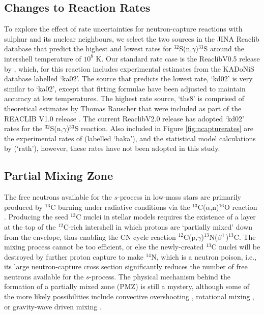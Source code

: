 \subsection{Changes to Reaction Rates}\label{sec:reactionratechanges}
To explore the effect of rate uncertainties for neutron-capture reactions with sulphur and its nuclear neighbours, we select the two sources in the JINA Reaclib database that predict the highest and lowest rates for $^{32}$S(n,$\gamma$)$^{33}$S around the intershell temperature of $10^8$ K. Our standard rate case is the ReaclibV0.5 release by \cite{Cyburt:2010ey}, which, for this reaction includes experimental estimates from the KADoNiS database \citep{Dillmann:2006fl} labelled `ka02'. The source that predicts the lowest rate, `kd02' is very similar to `ka02', except that fitting formulae have been adjusted to maintain accuracy at low temperatures. The highest rate source, `ths8' is comprised of theoretical estimates by Thomas Rauscher that were included as part of the REACLIB V1.0 release \citep{Cyburt:2010ey}. The current ReaclibV2.0 release has adopted `kd02' rates for the $^{32}$S(n,$\gamma$)$^{33}$S reaction. Also included in Figure \ref{fig:ncapturerates} are the experimental rates of \citet{Bao:1987hy} (labelled `baka'), and the statistical model calculations by \citet{Rauscher:2000gg} (`rath'), however, these rates have not been adopted in this study.

\subsection{Partial Mixing Zone}\label{sec:s13pmz}
The free neutrons available for the $s$-process in low-mass stars are primarily produced by $^{13}$C burning under radiative conditions via the $^{13}$C($\alpha$,n)$^{16}$O reaction \citep{Straniero:1995ed,Gallino:1998eg}. Producing the seed $^{13}$C nuclei in stellar models requires the existence of a layer at the top of the $^{12}$C-rich intershell in which protons are `partially mixed' down from the envelope, thus enabling the CN cycle reaction $^{12}$C(p,$\gamma$)$^{13}$N($\beta^+$)$^{13}$C. The mixing process cannot be too efficient, or else the newly-created $^{13}$C nuclei will be destroyed by further proton capture to make $^{14}$N, which is a neutron poison, i.e., its large neutron-capture cross section significantly reduces the number of free neutrons available for the $s$-process. The physical mechanism behind the formation of a partially mixed zone (PMZ) is still a mystery, although some of the more likely possibilities include convective overshooting \citep{Herwig:2000ua,Cristallo:2004us}, rotational mixing \citep{Herwig:2001vb}, or gravity-wave driven mixing \citep{Denissenkov:2003gx}.

